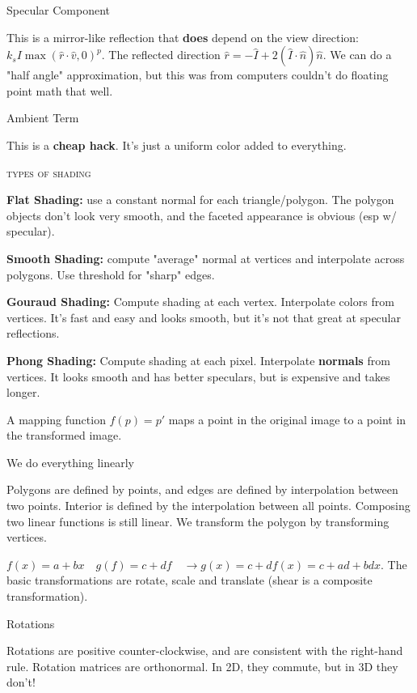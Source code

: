 \documentclass{article}
\begin{document}
\vspace{10pt}
Specular Component

This is a mirror-like reflection that {\bf does} depend on the view direction: $k_sI\max(\hat{r}\cdot\hat{v},0)^p$. The reflected direction $\hat{r}=-\hat{I}+2(\hat{I}\cdot\hat{n})\hat{n}$. We can do a "half angle" approximation, but this was from computers couldn't do floating point math that well.

\vspace{10pt}
Ambient Term

This is a {\bf cheap hack}. It's just a uniform color added to everything.

\begin{center}\textsc{types of shading}\end{center} 
	
{\bf Flat Shading:}  use a constant normal for each triangle/polygon. The polygon objects don't look very smooth, and the faceted appearance is obvious (esp w/ specular).

{\bf Smooth Shading:}  compute "average" normal at vertices and interpolate across polygons. Use threshold for "sharp" edges.

{\bf Gouraud Shading:} Compute shading at each vertex. Interpolate colors from vertices. It's fast and easy and looks smooth, but it's not that great at specular reflections.

{\bf Phong Shading:} Compute shading at each pixel. Interpolate {\bf normals} from vertices. It looks smooth and has better speculars, but is expensive and takes longer.

A mapping function $f(p) = p'$ maps a point in the original image to a point in the transformed image.

\vspace{10pt}
We do everything linearly

Polygons are defined by points, and edges are defined by interpolation between two points. Interior is defined by the interpolation between all points. Composing two linear functions is still linear. We transform the polygon by transforming vertices.

$f(x)=a+bx\quad g(f) = c+df \quad \rightarrow g(x)=c+df(x)=c+ad+bdx$. The basic transformations are rotate, scale and translate (shear is a composite transformation). 

\vspace{10pt}
Rotations

Rotations are positive counter-clockwise, and are consistent with the right-hand rule. Rotation matrices are orthonormal. In 2D, they commute, but in 3D they don't!
\end{document}
